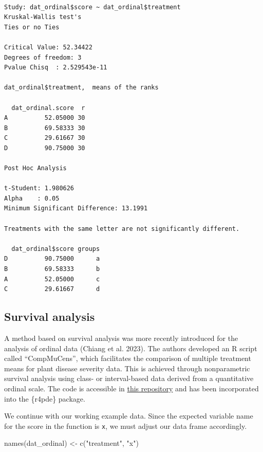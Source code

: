 \documentclass[
  letterpaper,
]{book}
\newenvironment{Shaded}{\begin{snugshade}}{\end{snugshade}}
\newcommand{\FunctionTok}[1]{\textcolor[rgb]{0.28,0.35,0.67}{#1}}
\newcommand{\NormalTok}[1]{\textcolor[rgb]{0.00,0.23,0.31}{#1}}
\newcommand{\OtherTok}[1]{\textcolor[rgb]{0.00,0.23,0.31}{#1}}
\newcommand{\StringTok}[1]{\textcolor[rgb]{0.13,0.47,0.30}{#1}}
\begin{document}
\begin{verbatim}

Study: dat_ordinal$score ~ dat_ordinal$treatment
Kruskal-Wallis test's
Ties or no Ties

Critical Value: 52.34422
Degrees of freedom: 3
Pvalue Chisq  : 2.529543e-11 

dat_ordinal$treatment,  means of the ranks

  dat_ordinal.score  r
A          52.05000 30
B          69.58333 30
C          29.61667 30
D          90.75000 30

Post Hoc Analysis

t-Student: 1.980626
Alpha    : 0.05
Minimum Significant Difference: 13.1991 

Treatments with the same letter are not significantly different.

  dat_ordinal$score groups
D          90.75000      a
B          69.58333      b
A          52.05000      c
C          29.61667      d
\end{verbatim}

\hypertarget{survival-analysis}{%
\subsection{Survival analysis}\label{survival-analysis}}

A method based on survival analysis was more recently introduced for the
analysis of ordinal data (Chiang et al. 2023). The authors developed an
R script called ``CompMuCens'', which facilitates the comparison of
multiple treatment means for plant disease severity data. This is
achieved through nonparametric survival analysis using class- or
interval-based data derived from a quantitative ordinal scale. The code
is accessible in
\href{https://github.com/StatisticalMethodsinPlantProtection/CompMuCens/tree/main}{this
repository} and has been incorporated into the \{r4pde\} package.

We continue with our working example data. Since the expected variable
name for the score in the function is \texttt{x}, we must adjust our
data frame accordingly.

\begin{Shaded}
\begin{Highlighting}[]
\FunctionTok{names}\NormalTok{(dat\_ordinal) }\OtherTok{\textless{}{-}} \FunctionTok{c}\NormalTok{(}\StringTok{"treatment"}\NormalTok{, }\StringTok{"x"}\NormalTok{)}
\end{Highlighting}
\end{Shaded}
\end{document}

